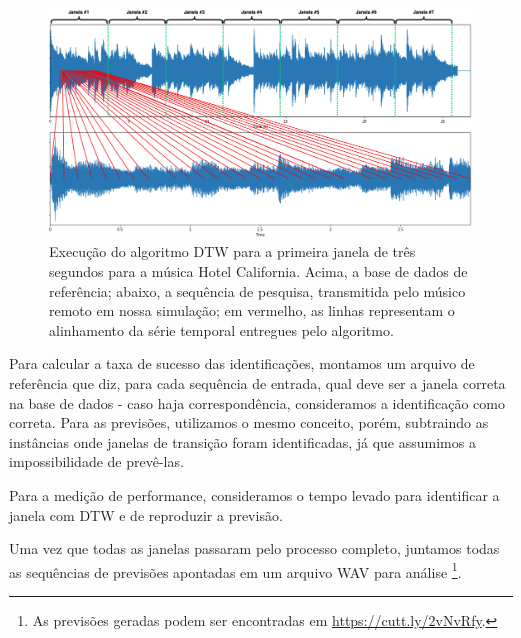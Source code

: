 \begin{figure}[htbp]
    \centering
    \includegraphics[width=1\textwidth]{images/dtw hotel California.png}
    \caption{Execução do algoritmo DTW para a primeira janela de três segundos para a música Hotel California. Acima, a base de dados de referência; abaixo, a sequência de pesquisa, transmitida pelo músico remoto em nossa simulação; em vermelho, as linhas representam o alinhamento da série temporal entregues pelo algoritmo.}
    \label{fig:dtw_hotel_california}
\end{figure}

Para calcular a taxa de sucesso das identificações, montamos um arquivo de referência que diz, para cada sequência de entrada, qual deve ser a janela correta na base de dados - caso haja correspondência, consideramos a identificação como correta. Para as previsões, utilizamos o mesmo conceito, porém, subtraindo as instâncias onde janelas de transição foram identificadas, já que assumimos a impossibilidade de prevê-las.

Para a medição de performance, consideramos o tempo levado para identificar a janela com DTW e de reproduzir a previsão.

Uma vez que todas as janelas passaram pelo processo completo, juntamos todas as sequências de previsões apontadas em um arquivo WAV para análise \footnote{As previsões geradas podem ser encontradas em \url{https://cutt.ly/2vNvRfy}.}.